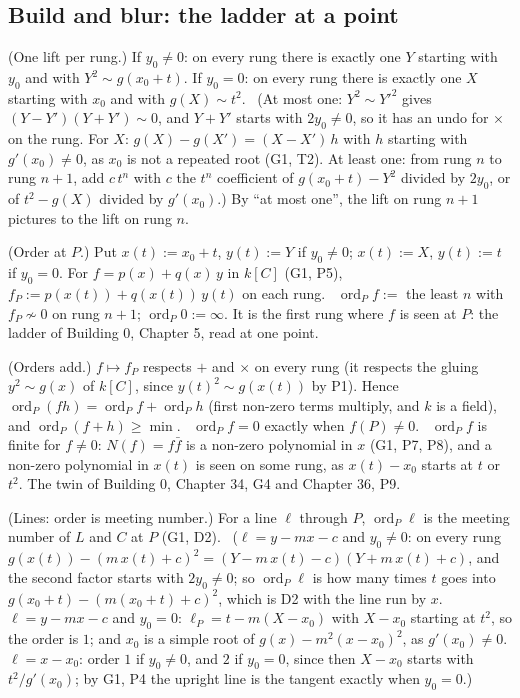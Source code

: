\subsection*{Build and blur: the ladder at a point}

\begin{lines}
\item[\lab{P1}] (One lift per rung.) If $y_0 \ne 0$: on every rung there is exactly one $Y$ starting with $y_0$ and with $Y^2 \sim g(x_0 + t)$. If $y_0 = 0$: on every rung there is exactly one $X$ starting with $x_0$ and with $g(X) \sim t^2$. \ (At most one: $Y^2 \sim Y'^2$ gives $(Y - Y')(Y + Y') \sim 0$, and $Y + Y'$ starts with $2 y_0 \ne 0$, so it has an undo for $\times$ on the rung. For $X$: $g(X) - g(X') = (X - X')\,h$ with $h$ starting with $g'(x_0) \ne 0$, as $x_0$ is not a repeated root (G1, T2). At least one: from rung $n$ to rung $n + 1$, add $c\,t^n$ with $c$ the $t^n$ coefficient of $g(x_0 + t) - Y^2$ divided by $2y_0$, or of $t^2 - g(X)$ divided by $g'(x_0)$.) By ``at most one'', the lift on rung $n + 1$ pictures to the lift on rung $n$.
\item[\lab{D4}] (Order at $P$.) Put $x(t) := x_0 + t$, $y(t) := Y$ if $y_0 \ne 0$; $x(t) := X$, $y(t) := t$ if $y_0 = 0$. For $f = p(x) + q(x)\,y$ in $k[C]$ (G1, P5), $f_P := p(x(t)) + q(x(t))\,y(t)$ on each rung. \ $\operatorname{ord}_P f :=$ the least $n$ with $f_P \not\sim 0$ on rung $n + 1$; $\operatorname{ord}_P 0 := \infty$. It is the first rung where $f$ is seen at $P$: the ladder of Building 0, Chapter 5, read at one point.
\item[\lab{P2}] (Orders add.) $f \mapsto f_P$ respects $+$ and $\times$ on every rung (it respects the gluing $y^2 \sim g(x)$ of $k[C]$, since $y(t)^2 \sim g(x(t))$ by P1). Hence $\operatorname{ord}_P(fh) = \operatorname{ord}_P f + \operatorname{ord}_P h$ (first non-zero terms multiply, and $k$ is a field), and $\operatorname{ord}_P(f + h) \ge \min$. \ $\operatorname{ord}_P f = 0$ exactly when $f(P) \ne 0$. \ $\operatorname{ord}_P f$ is finite for $f \ne 0$: $N(f) = f \bar f$ is a non-zero polynomial in $x$ (G1, P7, P8), and a non-zero polynomial in $x(t)$ is seen on some rung, as $x(t) - x_0$ starts at $t$ or $t^2$. The twin of Building 0, Chapter 34, G4 and Chapter 36, P9.
\item[\lab{P3}] (Lines: order is meeting number.) For a line $\ell$ through $P$, $\operatorname{ord}_P \ell$ is the meeting number of $L$ and $C$ at $P$ (G1, D2). \ ($\ell = y - mx - c$ and $y_0 \ne 0$: on every rung $g(x(t)) - (m\,x(t) + c)^2 = (Y - m\,x(t) - c)(Y + m\,x(t) + c)$, and the second factor starts with $2y_0 \ne 0$; so $\operatorname{ord}_P \ell$ is how many times $t$ goes into $g(x_0 + t) - (m(x_0 + t) + c)^2$, which is D2 with the line run by $x$. $\ell = y - mx - c$ and $y_0 = 0$: $\ell_P = t - m(X - x_0)$ with $X - x_0$ starting at $t^2$, so the order is $1$; and $x_0$ is a simple root of $g(x) - m^2(x - x_0)^2$, as $g'(x_0) \ne 0$. $\ell = x - x_0$: order $1$ if $y_0 \ne 0$, and $2$ if $y_0 = 0$, since then $X - x_0$ starts with $t^2 / g'(x_0)$; by G1, P4 the upright line is the tangent exactly when $y_0 = 0$.)

\end{lines}
